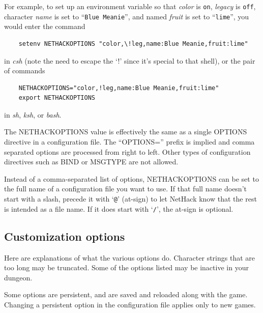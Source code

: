 \documentclass[titlepage]{article}
\begin{document}
For example, to set up an environment variable so that
\textit{color} is \texttt{on},
\textit{legacy} is \texttt{off},
character \textit{name} is set to ``\texttt{Blue Meanie}'',
and named \textit{fruit} is set to ``\texttt{lime}'',
you would enter the command
\begin{verbatim}
    setenv NETHACKOPTIONS "color,\!leg,name:Blue Meanie,fruit:lime"
\end{verbatim}

\noindent in \textit{csh}
(note the need to escape the `!' since it's special
to that shell), or the pair of commands
\begin{verbatim}
    NETHACKOPTIONS="color,!leg,name:Blue Meanie,fruit:lime"
    export NETHACKOPTIONS
\end{verbatim}

\noindent in \textit{sh}, \textit{ksh}, or \textit{bash}.

The NETHACKOPTIONS value is effectively the same as a single OPTIONS
directive in a configuration file.
The ``OPTIONS='' prefix is implied and comma separated options are
processed from right to left.
Other types of configuration directives such as BIND or MSGTYPE are
not allowed.

Instead of a comma-separated list of options,
NETHACKOPTIONS can be set to the full name of a configuration file you
want to use.
If that full name doesn't start with a slash, precede it with `\texttt{@}'
(at-sign) to let NetHack know that the rest is intended as a file name.
If it does start with `\texttt{/}', the at-sign is optional.

\subsection*{Customization options}

Here are explanations of what the various options do.
Character strings that are too long may be truncated.
Some of the options listed may be inactive in your dungeon.

Some options are persistent, and are saved and reloaded along with
the game.  Changing a persistent option in the configuration file
applies only to new games.
\end{document}
